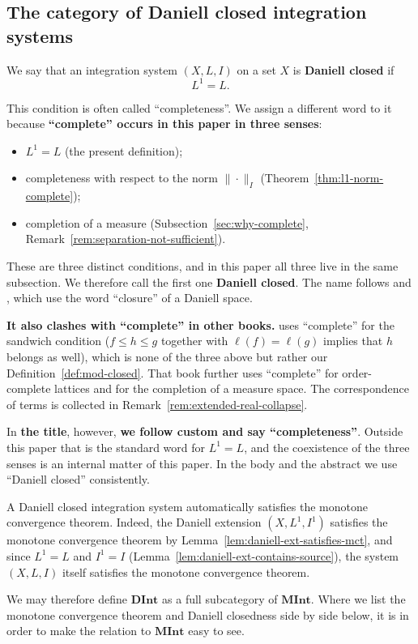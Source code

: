 \subsection{The category of Daniell closed integration systems}

\begin{definition}\label{def:daniell-closed}
  We say that an integration system $(X,L,I)$ on a set $X$ is
  \textbf{Daniell closed} if
  \[
    L^1=L .
  \]
\end{definition}

\begin{remark}[on terminology]\label{rem:why-daniell-closed}
  This condition is often called ``completeness''.
  We assign a different word to it because
  \textbf{``complete'' occurs in this paper in three senses}:
  \begin{itemize}
    \item $L^1=L$ (the present definition);
    \item completeness with respect to the norm $\|\cdot\|_I$
      (Theorem~\ref{thm:l1-norm-complete});
    \item completion of a measure (Subsection~\ref{sec:why-complete},
      Remark~\ref{rem:separation-not-sufficient}).
  \end{itemize}
  These are three distinct conditions, and in this paper all three live in the
  same subsection.
  We therefore call the first one \textbf{Daniell closed}.
  The name follows \cite{CWS} and \cite{CFW}, which use the word ``closure'' of a
  Daniell space.

  \textbf{It also clashes with ``complete'' in other books.}
  \cite{CWS} uses ``complete'' for the sandwich condition ($f\le h\le g$
  together with $\ell(f)=\ell(g)$ implies that $h$ belongs as well), which is
  none of the three above but rather our
  Definition~\ref{def:mod-closed}.
  That book further uses ``complete'' for order-complete lattices and for the
  completion of a measure space.
  The correspondence of terms is collected in
  Remark~\ref{rem:extended-real-collapse}.

  In \textbf{the title}, however, \textbf{we follow custom and say
  ``completeness''}.
  Outside this paper that is the standard word for $L^1=L$, and the coexistence
  of the three senses is an internal matter of this paper.
  In the body and the abstract we use ``Daniell closed'' consistently.
\end{remark}

\begin{remark}\label{rem:complete-implies-mct}
  A Daniell closed integration system automatically satisfies the monotone
  convergence theorem.
  Indeed, the Daniell extension $(X,L^1,I^1)$ satisfies the monotone convergence
  theorem by Lemma~\ref{lem:daniell-ext-satisfies-mct}, and since $L^1=L$ and
  $I^1=I$ (Lemma~\ref{lem:daniell-ext-contains-source}), the system $(X,L,I)$
  itself satisfies the monotone convergence theorem.

  We may therefore define $\mathbf{DInt}$ as a full subcategory of
  $\mathbf{MInt}$.
  Where we list the monotone convergence theorem and Daniell closedness side by
  side below, it is in order to make the relation to $\mathbf{MInt}$ easy to see.
\end{remark}

